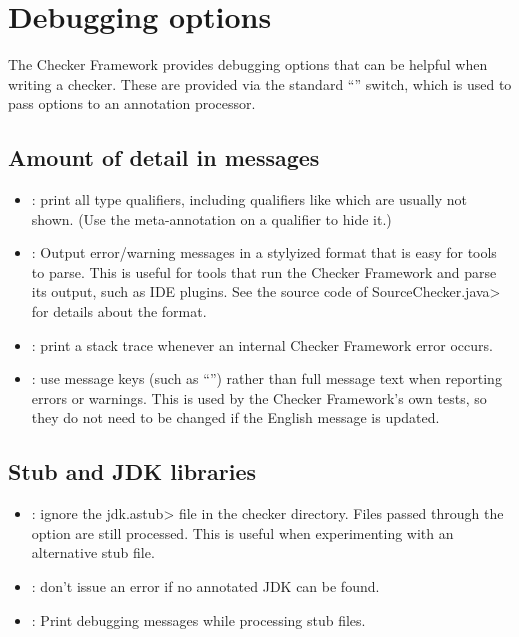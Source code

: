 \section{Debugging options\label{debugging-options}}

The Checker Framework provides debugging options that can be helpful when
writing a checker. These are provided via the standard  ``''
switch, which is used to pass options to an annotation processor.

\subsection{Amount of detail in messages\label{debugging-options-detail}}

\begin{itemize}
\item {}: print all type qualifiers, including
qualifiers like  which are usually not shown.
(Use the  meta-annotation on a qualifier to hide it.)

\item {}: Output error/warning messages in a
  stylyized format that is easy for tools to parse.  This is useful for
  tools that run the Checker Framework and parse its output, such as IDE
  plugins.  See the source code of \<SourceChecker.java> for details about
  the format.

\item {}: print a stack trace whenever an
internal Checker Framework error occurs.

\item {}: use message keys (such as ``'')
rather than full message text when reporting errors or warnings.  This is
used by the Checker Framework's own tests, so they do not need to be
changed if the English message is updated.

\end{itemize}

\subsection{Stub and JDK libraries\label{debugging-options-libraries}}

\begin{itemize}

\item {}:
  ignore the \<jdk.astub> file in the checker directory. Files passed
  through the  option are still processed. This is useful
  when experimenting with an alternative stub file.

\item {}:
  don't issue an error if no annotated JDK can be found.

\item {}:
  Print debugging messages while processing stub files.

\end{itemize}

